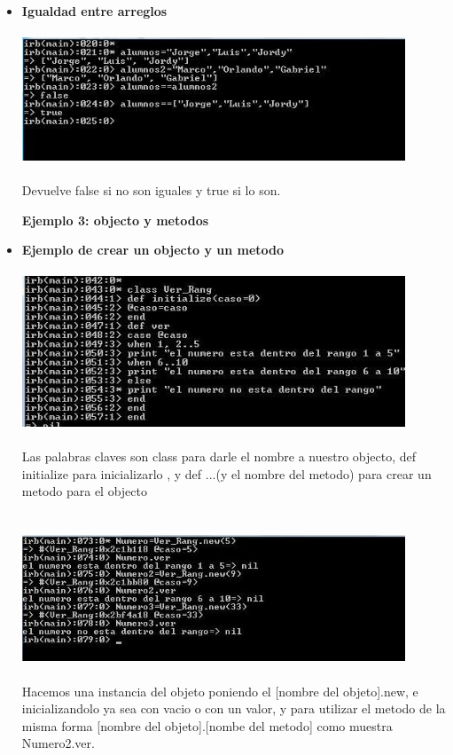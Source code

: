 \documentclass[11pt]{article} %
\begin{document}
\begin{itemize}
    \item {\bf Igualdad entre arreglos}\\\\
	    \includegraphics[width=0.9\textwidth]{./imagenes/igualdad}\\\\
Devuelve false si no son iguales y true si lo son.

 {\fontsize{14}{0} \bf Ejemplo 3: objecto y metodos\\}
  \item {\bf Ejemplo de crear un objecto y un metodo}\\\\
	    \includegraphics[width=0.9\textwidth]{./imagenes/objeto}\\\\
Las palabras claves son class para darle el nombre a nuestro objecto,  def  initialize  para inicializarlo , y def ...(y el nombre del metodo) para crear un metodo para el objecto\\
  	   \\\\
	    \includegraphics[width=0.9\textwidth]{./imagenes/ejemplo_de_clase}\\\\
Hacemos una instancia del objeto poniendo el [nombre del objeto].new, e inicializandolo ya sea con vacio o con un valor, y para utilizar el metodo de la misma forma [nombre del objeto].[nombe del metodo] como muestra Numero2.ver.\\


\end{itemize}
\end{document}

